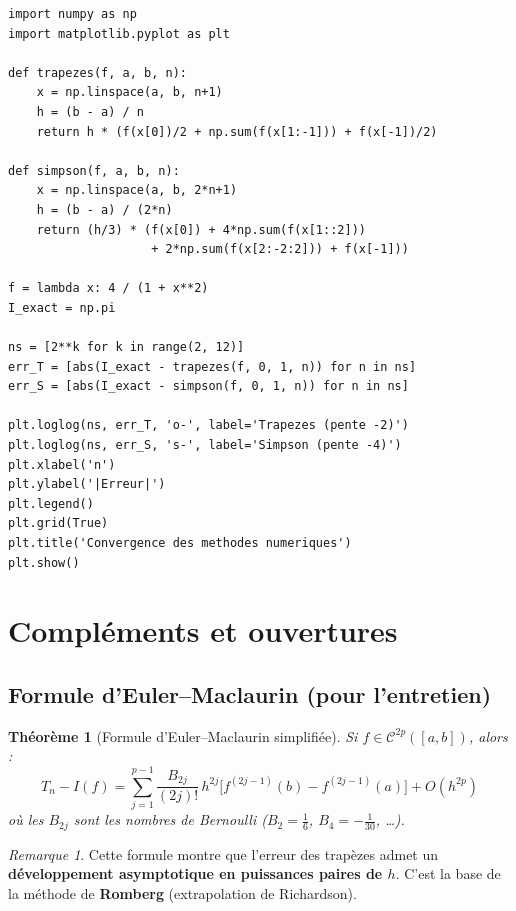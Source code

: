 \documentclass[a4paper,12pt]{article}
\theoremstyle{definition}
\theoremstyle{plain}
\newtheorem{theoreme}{Théorème}[section]
\theoremstyle{remark}
\newtheorem{remarque}{Remarque}[section]
\begin{document}
\begin{lstlisting}[caption={Vérification de l'ordre de convergence}]
import numpy as np
import matplotlib.pyplot as plt

def trapezes(f, a, b, n):
    x = np.linspace(a, b, n+1)
    h = (b - a) / n
    return h * (f(x[0])/2 + np.sum(f(x[1:-1])) + f(x[-1])/2)

def simpson(f, a, b, n):
    x = np.linspace(a, b, 2*n+1)
    h = (b - a) / (2*n)
    return (h/3) * (f(x[0]) + 4*np.sum(f(x[1::2]))
                    + 2*np.sum(f(x[2:-2:2])) + f(x[-1]))

f = lambda x: 4 / (1 + x**2)
I_exact = np.pi

ns = [2**k for k in range(2, 12)]
err_T = [abs(I_exact - trapezes(f, 0, 1, n)) for n in ns]
err_S = [abs(I_exact - simpson(f, 0, 1, n)) for n in ns]

plt.loglog(ns, err_T, 'o-', label='Trapezes (pente -2)')
plt.loglog(ns, err_S, 's-', label='Simpson (pente -4)')
plt.xlabel('n')
plt.ylabel('|Erreur|')
plt.legend()
plt.grid(True)
plt.title('Convergence des methodes numeriques')
plt.show()
\end{lstlisting}

\section{Compléments et ouvertures}

\subsection{Formule d'Euler--Maclaurin (pour l'entretien)}

\begin{theoreme}[Formule d'Euler--Maclaurin simplifiée]
Si $f \in \mathcal{C}^{2p}([a,b])$, alors :
\[
  T_n - I(f) = \sum_{j=1}^{p-1} \frac{B_{2j}}{(2j)!}\,h^{2j}\big[f^{(2j-1)}(b) - f^{(2j-1)}(a)\big] + O(h^{2p})
\]
où les $B_{2j}$ sont les nombres de Bernoulli ($B_2 = \frac{1}{6}$, $B_4 = -\frac{1}{30}$, \ldots).
\end{theoreme}

\begin{remarque}
Cette formule montre que l'erreur des trapèzes admet un \textbf{développement asymptotique en puissances paires de $h$}. C'est la base de la méthode de \textbf{Romberg} (extrapolation de Richardson).
\end{remarque}
\end{document}
